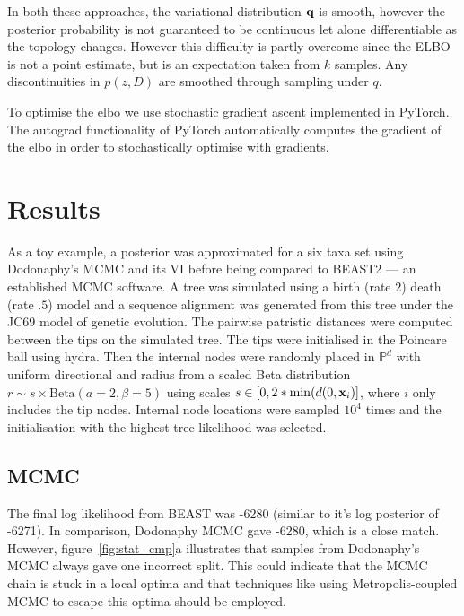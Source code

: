 \documentclass[11pt]{article}
\begin{document}
In both these approaches, the variational distribution $\bold{q}$ is smooth, however the posterior probability is not guaranteed to be continuous let alone differentiable as the topology changes.
However this difficulty is partly overcome since the ELBO is not a point estimate, but is an expectation taken from $k$ samples.
Any discontinuities in $p(z,D)$ are smoothed through sampling under $q$.

To optimise the elbo we use stochastic gradient ascent implemented in PyTorch.
The autograd functionality of PyTorch automatically computes the gradient of the elbo in order to stochastically optimise with gradients.

\section{Results}
As a toy example, a posterior was approximated for a six taxa set using Dodonaphy's MCMC and its VI before being compared to BEAST2 --- an established MCMC software.
A tree was simulated using a birth (rate $2$) death (rate $.5$) model and a sequence alignment was generated from this tree under the JC69 model of genetic evolution.
The pairwise patristic distances were computed between the tips on the simulated tree.
The tips were initialised in the Poincare ball using hydra.
Then the internal nodes were randomly placed in $\mathbb{P}^{d}$ with uniform directional and radius from a scaled Beta distribution $ r \sim s \times \text{Beta}(a=2, \beta=5)$ using scales $s \in [0, 2*\min(d(0, \bold{x}_{i})]$, where $i$ only includes the tip nodes.
Internal node locations were sampled $10^{4}$ times and the initialisation with the highest tree likelihood was selected.

\subsection{MCMC}
The final log likelihood from BEAST was -6280 (similar to it's log posterior of -6271). In comparison, Dodonaphy MCMC gave -6280, which is a close match.
However, figure~\ref{fig:stat_cmp}a illustrates that samples from Dodonaphy's MCMC always gave one incorrect split.
This could indicate that the MCMC chain is stuck in a local optima and that techniques like using Metropolis-coupled MCMC to escape this optima should be employed.
\end{document}
